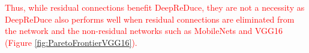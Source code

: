 \textcolor{red}{
Thus, while residual connections benefit DeepReDuce, they are not
a necessity as DeepReDuce also performs well when residual connections are eliminated from the network and the non-residual networks such as MobileNets and VGG16 (Figure \ref{fig:ParetoFrontierVGG16}).}










